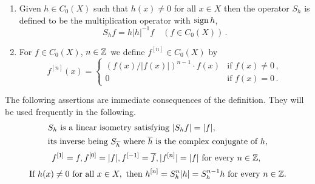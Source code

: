 	\begin{definition}\label{def:b3-2.2}
\begin{enumerate}[\upshape (i)]
		
\item
Given $h \in C_{0}(X)$ such that $h(x) \neq 0$ for all $x \in X$ then the operator $S_{h}$ is defined to be the multiplication operator with $ \operatorname{sign} h $, \ie
		\begin{equation}\label{eq:b3-2.3}
			S_{h}f = h|h|^{-1}f \quad (f \in C_{0}(X))\,.
		\end{equation}
		
\item
For $f \in C_{0}(X)$, $n \in \mathbb{Z}$ we define $f^{[n]} \in C_{0}(X)$ by
\begin{equation}\label{eq:b3-2.4}
	f^{[n]}(x) = 
	\begin{cases}
			(f(x)/|f(x)|)^{n-1}\cdot f(x) & \text{if } f(x) \neq 0\,,\\			
			0 & \text{if } f(x) = 0\,.
			\end{cases}
\end{equation}
\end{enumerate}
\end{definition}
The following assertions are immediate consequences of the definition. 
They will be used frequently in the following.
\begin{equation}\label{eq:b3-2.5}
	\begin{split}
		&S_{h} \text{  is a linear isometry satisfying  } |S_{h}f| = |f|, \\ 
		&\text{its inverse being  } S_{\overline{h}} \text{  where  } \overline{h} \text{ is the complex conjugate of $ h $,}
	\end{split}
\end{equation}
\begin{equation}\label{eq:b3-2.6}
	    f^{[1]} = f, f^{[0]} = |f|, f^{[-1]} = \overline{f}, |f^{[n]}| = |f| \text{  for every $n \in \mathbb{Z}$, }
\end{equation}
\begin{equation}\label{eq:b3-2.7}
	\text{If  } h(x) \neq 0 \text{  for all  } x \in X, \text{  then  } h^{[n]} = S_{h}^{n}|h| = S_{h}^{n-1}h
	\text{  for every $ n \in \mathbb{Z} $.} 
\end{equation}
